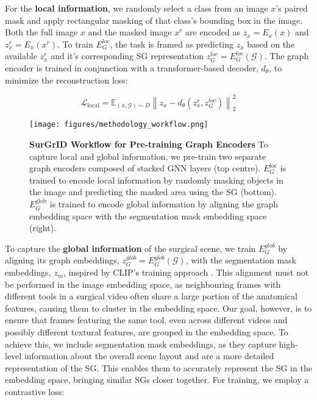 For the \textbf{local information}, we randomly select a class from an image $x$'s paired mask and apply rectangular masking of that class's bounding box in the image. Both the full image $x$ and the masked image $x^r$ are encoded as $z_x = E_x(x)$ and $z_x^r = E_x(x^r)$. To train $E_G^{loc}$, the task is framed as predicting $z_x$ based on the available $z_x^r$ and it's corresponding SG representation $z_G^{loc} = E_G^{loc}(\mathcal{G})$. The graph encoder is trained in conjunction with a transformer-based decoder, $d_\theta$, to minimize the reconstruction loss:

\begin{equation}
    \mathcal{L}_{\text{local}} = \mathbb{E}_{(x, \mathcal{G}) \sim D} \left\| z_x - d_\theta \left( z_x^r, z_G^{loc} \right) \right\|_2^2
\end{equation}

\begin{figure}[htbp]
    \centering
    \texttt{[image: figures/methodology\_workflow.png]}
    \caption{\textbf{SurGrID Workflow for Pre-training Graph Encoders} To capture local and global information, we pre-train two separate graph encoders composed of stacked GNN layers (top centre). $E_G^\text{loc}$ is trained to encode local information by randomly masking objects in the image and predicting the masked area using the SG (bottom). $E_G^\text{glob}$ is trained to encode global information by aligning the graph embedding space with the segmentation mask embedding space (right).}
    \label{fig:methodology}
\end{figure}

\indent To capture the \textbf{global information} of the surgical scene, we train $E_G^{glob}$ by aligning its graph embeddings, $z_G^{glob} = E_G^{glob}(\mathcal{G})$, with the segmentation mask embeddings, $z_m$, inspired by CLIP's training approach \cite{radford2021learning}. This alignment must not be performed in the image embedding space, as neighbouring frames with different tools in a surgical video often share a large portion of the anatomical features, causing them to cluster in the embedding space. Our goal, however, is to ensure that frames featuring the same tool, even across different videos and possibly different textural features, are grouped in the embedding space. To achieve this, we include segmentation mask embeddings, as they capture high-level information about the overall scene layout and are a more detailed representation of the SG. This enables them to accurately represent the SG in the embedding space, bringing similar SGs closer together. For training, we employ a contrastive loss:

